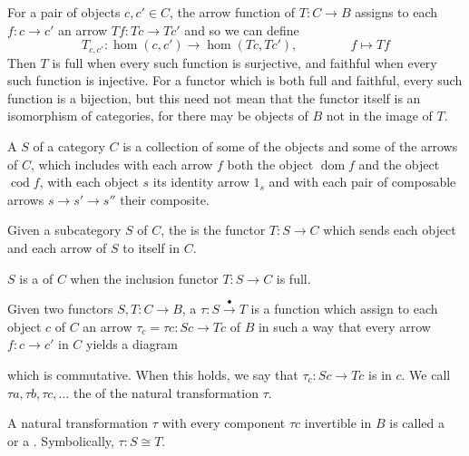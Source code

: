 \documentclass{mathnotes}
\DeclareMathOperator{\dom}{dom}
\DeclareMathOperator{\cod}{cod}
\begin{document}
For a pair of objects $c,c'\in C$, the arrow function of $T:C\rightarrow B$
assigns to each $f:c\rightarrow c'$ an arrow $Tf:Tc\rightarrow Tc'$ and so we
can define
\[T_{c,c'}:\hom(c,c')\rightarrow\hom(Tc,Tc'),\hspace{50pt}f\mapsto Tf\]
Then $T$ is full when every such function is surjective, and faithful when
every such function is injective. For a functor which is both full and
faithful, every such function is a bijection, but this need not mean that the
functor itself is an isomorphism of categories, for there may be objects of $B$
not in the image of $T$.

\begin{defi}
  A  $S$ of a category $C$ is a collection of some of the
  objects and some of the arrows of $C$, which includes with each arrow $f$
  both the object $\dom f$ and the object $\cod f$, with each object $s$ its
  identity arrow $1_s$ and with each pair of composable arrows $s\rightarrow
  s'\rightarrow s''$ their composite.
\end{defi}

\begin{defi}
  Given a subcategory $S$ of $C$, the  is the functor
  $T:S\rightarrow C$ which sends each object and each arrow of $S$ to itself in
  $C$.
\end{defi}

\begin{defi}
  $S$ is a  of $C$ when the inclusion functor
  $T:S\rightarrow C$ is full.
\end{defi}

\begin{bdefi}
  Given two functors $S,T:C\rightarrow B$, a 
  $\tau:S\xrightarrow{\bullet}T$ is a function which assign to each object $c$
  of $C$ an arrow $\tau_c=\tau c:Sc\rightarrow Tc$ of $B$ in such a way that
  every arrow $f:c\rightarrow c'$ in $C$ yields a diagram
  \begin{center}
  \end{center}
  which is commutative. When this holds, we say that $\tau_c:Sc\rightarrow Tc$
  is  in $c$. We call $\tau a,\tau b,\tau c,\ldots$ the
   of the natural transformation $\tau$.
\end{bdefi}

\begin{defi}
  A natural transformation $\tau$ with every component $\tau c$ invertible in
  $B$ is called a\\
   or a . Symbolically,
  $\tau:S\cong T$.
\end{defi}
\end{document}
